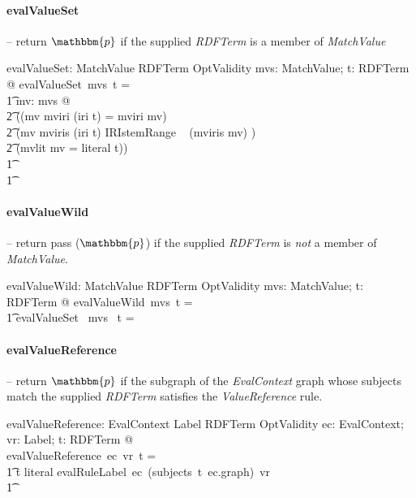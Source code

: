 \documentclass[fuzz]{llncs}
\def\entryFor{\cdot}
\def\pass{{\mathbbm{p}}}
\def\fail{{\mathbbm{f}}}
\def\zc{\textit}
\begin{document}
\paragraph{evalValueSet} -- return $\pass$ if the supplied \zc{RDFTerm} is a member of \zc{MatchValue}
\begin{gendef}
   evalValueSet: \power MatchValue \pfun RDFTerm \pfun OptValidity
\where
   \forall mvs: \power MatchValue; t: RDFTerm @ evalValueSet~mvs~t = \\
\t1	\IF \exists mv: mvs @ \\
\t2 ((mv \in \ran mviri \land (iri \entryFor t) = mviri \entryFor mv) \lor \\
\t2  (mv \in \ran mviris \land (iri \entryFor t) \in IRIstemRange ~ (mviris \entryFor mv) ) \lor \\
\t2  (mvlit \entryFor mv = literal \entryFor t)) \\
\t1 \THEN \pass \\
\t1 \ELSE \fail
\end{gendef}


\paragraph{evalValueWild} -- return pass ($\pass$) if the supplied \zc{RDFTerm} is \textit{not} a member of \zc{MatchValue}.

\begin{gendef}
   evalValueWild: \power MatchValue \fun RDFTerm \fun OptValidity
\where
   \forall mvs: \power MatchValue; t: RDFTerm @ evalValueWild~mvs~t = \\
\t1 \IF evalValueSet~ mvs~ t = \pass \THEN \fail \ELSE \pass
\end{gendef}

\paragraph{evalValueReference} -- return $\pass$ if the subgraph of the \zc{EvalContext} graph whose subjects match the supplied \zc{RDFTerm} satisfies the \zc{ValueReference} rule.

\begin{gendef}
   evalValueReference: EvalContext \pfun Label \pfun RDFTerm \pfun OptValidity
\where
	\forall ec: EvalContext; vr: Label; t: RDFTerm @ \\ evalValueReference~ec~vr~t = \\
\t1 \IF t \notin \ran literal \THEN evalRuleLabel~ec~(subjects~t~ec.graph)~vr \\
\t1 \ELSE \fail
\end{gendef}
\end{document}
